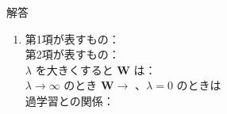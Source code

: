 \documentclass[a4paper,dvipdfmx]{jsarticle}
\newcommand{\提出期限}{2026年10月12日（月）}
\newcommand{\学籍番号}{0000000}
\newcommand{\氏名}{氏名を書く}
\newcommand{\提出日}{2026年10月12日}
\newenvironment{answer}{\begin{itembox}[l]{解答}}{\end{itembox}}
\begin{document}
\begin{enumerate}
\begin{answer}
\begin{enumerate}
\begin{equation*}
            \bm{A}^\top \bm{A} =
          \end{equation*}
          \begin{equation*}
            \mathrm{tr}(\bm{A}^\top \bm{A}) =
          \end{equation*}
        \item 第1項が表すもの：\\[3mm]
          第2項が表すもの：\\[3mm]
          $\lambda$ を大きくすると $\bm{W}$ は：\\[3mm]
          $\lambda \to \infty$ のとき $\bm{W} \to $ \phantom{XXXX}、$\lambda = 0$ のときは \\[3mm]
          過学習との関係：
      \end{enumerate}
    \end{answer}


\end{enumerate}
\end{document}
